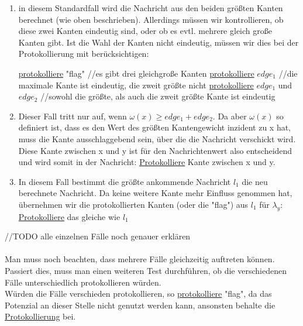 \begin{enumerate}[label=\alph*)]
	
	\item in diesem Standardfall wird die Nachricht aus den beiden größten Kanten berechnet (wie oben beschrieben). Allerdings müssen wir kontrollieren, ob diese zwei Kanten eindeutig sind, oder ob es evtl. mehrere gleich große Kanten gibt. Ist die Wahl der Kanten nicht eindeutig, müssen wir dies bei der Protokollierung mit berücksichtigen:\\
	
		\begin{algorithmic}
			\State \uline{protokolliere} "flag"
			\State//es gibt drei gleichgroße Kanten
			\State \uline{protokolliere} $edge_{1}$
			\State//die maximale Kante ist eindeutig, die zweit größte nicht
			\Else
			\State \uline{protokolliere} $edge_{1}$ und $edge_{2}$
			\State//sowohl die größte, als auch die zweit größte Kante ist eindeutig
			\EndIf
		\end{algorithmic}
	
	\item Dieser Fall tritt nur auf, wenn $\omega(x) \geq edge_{1}+edge_{2}$. Da aber $\omega(x)$ so definiert ist, dass es den Wert des größten Kantengewicht inzident zu x hat, muss die Kante ausschlaggebend sein, über die die Nachricht verschickt wird. 
	\\
	Diese Kante zwischen x und y ist für den Nachrichtenwert also entscheidend und wird somit in der Nachricht: \uline{Protokolliere} Kante zwischen x und y.
	
	\item In diesem Fall bestimmt die größte ankommende Nachricht $l_{1}$ die neu berechnete Nachricht. Da keine weitere Kante mehr Einfluss genommen hat, übernehmen wir die protokollierten Kanten (oder die "flag") aus $l_{1}$ für $\lambda_{y}$: \uline{Protokolliere} das gleiche wie $l_{1}$
	
\end{enumerate}

//TODO alle einzelnen Fälle noch genauer erklären
\\
\\

Man muss noch beachten, dass mehrere Fälle gleichzeitig auftreten können. Passiert dies, muss man einen weiteren Test durchführen, ob die verschiedenen Fälle unterschiedlich protokollieren würden.
\\
Würden die Fälle verschieden protokollieren, so \uline{protokolliere} "flag", da das Potenzial an dieser Stelle nicht genutzt werden kann, ansonsten behalte die \uline{Protokollierung} bei.

